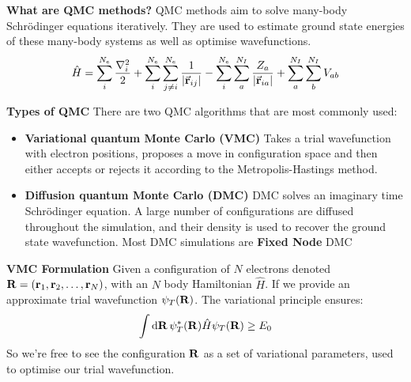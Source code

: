 \documentclass[10pt]{beamer}
\begin{document}
\begin{frame}[allowframebreaks]
    \textbf{What are QMC methods?}\medskip\newline
    QMC methods aim to solve many-body Schr\"odinger equations iteratively. They are used to estimate ground state energies of these many-body systems as well as optimise wavefunctions.\medskip\newline
    \begin{equation}
        \hat{H}=\sum\limits_{i}^{N_e}\frac{\nabla_i^2}{2}+\sum\limits_{i}^{N_e}\sum\limits_{j\neq i}^{N_e}\frac{1}{\vqty{\va{r}_{ij}}}-\sum\limits_{i}^{N_e}\sum\limits_{a}^{N_I}\frac{Z_a}{\vqty{\va{r}_{ia}}}+\sum\limits_a^{N_I}\sum\limits_b^{N_I}V_{ab}
    \end{equation}
    \framebreak%

    \textbf{Types of QMC}\medskip\newline
    There are two QMC algorithms that are most commonly used:
    \begin{itemize}
        \item[\textbullet] \textbf{Variational quantum Monte Carlo (VMC)}\newline
        Takes a trial wavefunction with electron positions, proposes a move in configuration space and then either accepts or rejects it according to the Metropolis-Hastings method.\newline
        \item[\textbullet] \textbf{Diffusion quantum Monte Carlo (DMC)}\newline
        DMC solves an imaginary time Schr\"odinger equation. A large number of configurations are diffused throughout the simulation, and their density is used to recover the ground state wavefunction. Most DMC simulations are \textbf{Fixed Node} DMC
    \end{itemize}
    \framebreak%

    \textbf{VMC Formulation}\medskip\newline
    Given a configuration of $N$ electrons denoted
    $\vb{R}=\pqty{\vb{r}_1,\vb{r}_2,\ldots,\vb{r}_N}$, with an $N$
    body Hamiltonian $\hat{H}$.\newline
    If we provide an approximate trial wavefunction $\psi_T\pqty{\vb{R}}$. The
    variational principle ensures:
    \begin{equation}
        \int\dd{\vb{R}}\psi_T^*\pqty{\vb{R}}\hat{H}\psi_T\pqty{\vb{R}}\geq E_0
    \end{equation}
    So we're free to see the configuration $\vb{R}$ as a set of variational
    parameters, used to optimise our trial wavefunction.
    \framebreak


\end{frame}
\end{document}
